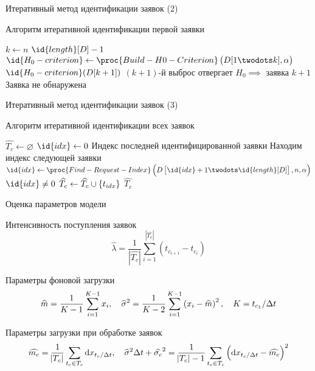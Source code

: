 \documentclass[utf8]{beamer}
\begin{document}
\begin{frame}{Итеративный метод идентификации заявок (2)}
\begin{block}{Алгоритм итеративной идентификации первой заявки}
  \begin{codebox}
  \li \For $k \gets n$ \To $\id{length}[D] - 1$
  \li \Do
        $\id{H_0-criterion} \gets
          \proc{Build-H0-Criterion}\del{D[1 \twodots k], \alpha}$
  \li   \If {} $\id{H_0-criterion}(D[k+1])$
  \zi   \Then
          \Comment $(k+1)$-й выброс отвергает $H_0 \implies$ заявка      
  \li     \Return $k+1$
        \End
  \li   \End
  \li {} \Comment Заявка не обнаружена
  \end{codebox}
\end{block}
\end{frame}


\begin{frame}{Итеративный метод идентификации заявок (3)}
\begin{block}{Алгоритм итеративной идентификации всех заявок}
  \begin{codebox}
  \li $\widehat{T_c} \gets \varnothing$
  \li $\id{idx} \gets 0$ \Comment Индекс последней идентифицированной заявки
  \li \While {}
  \li \Do
        \Comment Находим индекс следующей заявки
  \li   $\id{idx} \gets \proc{Find-Request-Index}
            \del{D\sbr{\id{idx} + 1 \twodots \id{length}[D]}, 
            n, \alpha}$
  \li   \If $\id{idx} \neq 0$
  \li   \Then
          $\widehat{T_c} \gets \widehat{T_c} \cup \cbr{t_{idx}}$
  \li   \Else
          \Return $\widehat{T_c}$
        \End
      \End
  \end{codebox}
\end{block}
\end{frame}


\begin{frame}{Оценка параметров модели}

\begin{block}{Интенсивность поступления заявок}
$$\widehat{\lambda} = 
    \frac{1}{|\widehat{T_c}|} 
        \sum\limits_{i=1}^{|\widehat{T_c}|} (t_{c_{i+1}} - t_{c_i})$$
\end{block}
\begin{block}{Параметры фоновой загрузки}
$$
  \widehat{m} = \frac{1}{K-1} \sum\limits_{i=1}^{K-1} x_i, \quad
  \widehat{\sigma}^2 = 
      \frac{1}{K-2} \sum\limits_{i=1}^{K-1} \del{x_i - \widehat{m}}^2, \quad
  K = t_{c_1} / \Delta t
$$
\end{block}
\begin{block}{Параметры загрузки при обработке заявок}
$$
  \widehat{m_c} = \frac{1}{\envert{T_c}} \sum\limits_{t_c \in T_c} 
      \dif x_{t_c / \Delta t}, \quad
  \widehat{\sigma}^2 \Delta t + \widehat{\sigma_c}^2 = 
      \frac{1}{\envert{T_c} - 1} \sum\limits_{t_c \in T_c}
      \del{\dif x_{t_c / \Delta t} - \widehat{m_c}}^2
$$
\end{block}
\end{frame}
\end{document}
